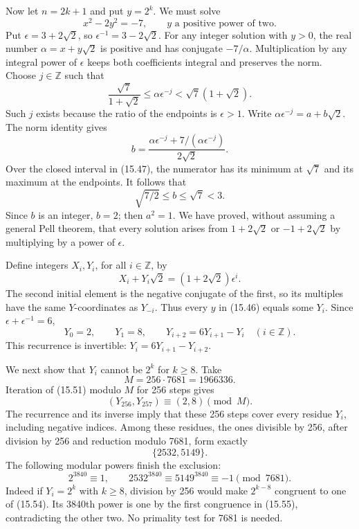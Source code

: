 \documentclass[
  11pt,
  a4paper,
]{article}
\begin{document}
Now let \(n=2k+1\) and put \(y=2^k\). We must solve \[
x^2-2y^2=-7,\qquad y\text{ a positive power of two}.
\tag{15.46}
\] Put \(\epsilon=3+2\sqrt2\), so \(\epsilon^{-1}=3-2\sqrt2\). For any
integer solution with \(y>0\), the real number \(\alpha=x+y\sqrt2\) is
positive and has conjugate \(-7/\alpha\). Multiplication by any integral
power of \(\epsilon\) keeps both coefficients integral and preserves the
norm. Choose \(j\in\mathbb Z\) such that \[
\frac{\sqrt7}{1+\sqrt2}
 \le \alpha\epsilon^{-j}
 <\sqrt7(1+\sqrt2).
\tag{15.47}
\] Such \(j\) exists because the ratio of the endpoints is
\(\epsilon>1\). Write \(\alpha\epsilon^{-j}=a+b\sqrt2\). The norm
identity gives \[
b=\frac{\alpha\epsilon^{-j}
                 +7/(\alpha\epsilon^{-j})}{2\sqrt2}.
\tag{15.48}
\] Over the closed interval in (15.47), the numerator has its minimum at
\(\sqrt7\) and its maximum at the endpoints. It follows that \[
\sqrt{7/2}\le b\le\sqrt7<3.
\tag{15.49}
\] Since \(b\) is an integer, \(b=2\); then \(a^2=1\). We have proved,
without assuming a general Pell theorem, that every solution arises from
\(1+2\sqrt2\) or \(-1+2\sqrt2\) by multiplying by a power of
\(\epsilon\).

Define integers \(X_i,Y_i\), for all \(i\in\mathbb Z\), by \[
X_i+Y_i\sqrt2=(1+2\sqrt2)\epsilon^i.
\tag{15.50}
\] The second initial element is the negative conjugate of the first, so
its multiples have the same \(Y\)-coordinates as \(Y_{-i}\). Thus every
\(y\) in (15.46) equals some \(Y_i\). Since
\(\epsilon+\epsilon^{-1}=6\), \[
Y_0=2,\qquad Y_1=8,\qquad
Y_{i+2}=6Y_{i+1}-Y_i
\quad(i\in\mathbb Z).
\tag{15.51}
\] This recurrence is invertible: \(Y_i=6Y_{i+1}-Y_{i+2}\).

We next show that \(Y_i\) cannot be \(2^k\) for \(k\ge8\). Take \[
M=256\cdot7681=1966336.
\tag{15.52}
\] Iteration of (15.51) modulo \(M\) for 256 steps gives \[
(Y_{256},Y_{257})\equiv(2,8)\pmod M.
\tag{15.53}
\] The recurrence and its inverse imply that these 256 steps cover every
residue \(Y_i\), including negative indices. Among these residues, the
ones divisible by 256, after division by 256 and reduction modulo 7681,
form exactly \[
\{2532,5149\}.
\tag{15.54}
\] The following modular powers finish the exclusion: \[
2^{3840}\equiv1,\qquad
2532^{3840}\equiv5149^{3840}\equiv-1\pmod{7681}.
\tag{15.55}
\] Indeed if \(Y_i=2^k\) with \(k\ge8\), division by 256 would make
\(2^{k-8}\) congruent to one of (15.54). Its 3840th power is one by the
first congruence in (15.55), contradicting the other two. No primality
test for 7681 is needed.
\end{document}
